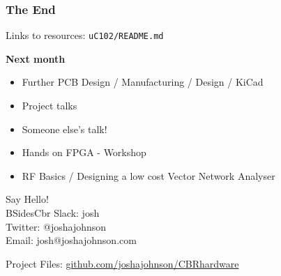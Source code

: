 \documentclass[t]{beamer}
\begin{document}

\begin{frame}
\frametitle{The End}
Links to resources: \texttt{uC102/README.md}
\vspace{5mm}

\textbf{Next month}
\begin{itemize}
	\item Further PCB Design / Manufacturing / Design / KiCad
	\item Project talks 
	\item Someone else's talk!
	\item Hands on FPGA - Workshop
	\item RF Basics / Designing a low cost Vector Network Analyser 

\end{itemize}

\vspace{5mm}
Say Hello! \\
BSidesCbr Slack: josh\\
Twitter:  @\textunderscore joshajohnson\\
Email: josh@joshajohnson.com\\
\vspace{4mm}

Project Files: \url{github.com/joshajohnson/CBRhardware}\\
\end{frame}
\end{document}
